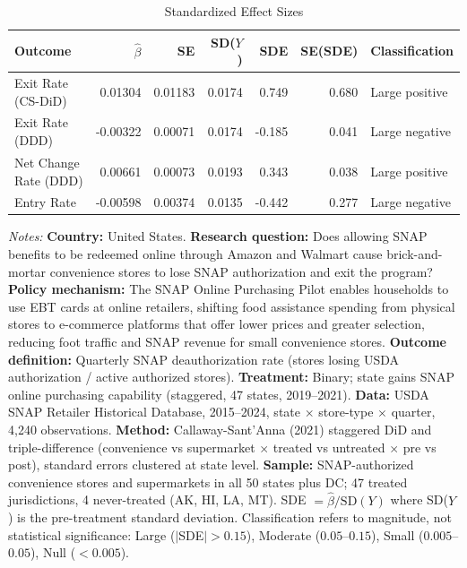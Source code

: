 \begin{table}[t]
\centering
\caption{Standardized Effect Sizes}
\label{tab:sde}
\small
\begin{tabular}{lrrrrrl}
\toprule
Outcome & $\hat{\beta}$ & SE & SD($Y$) & SDE & SE(SDE) & Classification \\
\midrule
Exit Rate (CS-DiD) & 0.01304 & 0.01183 & 0.0174 & 0.749 & 0.680 & Large positive \\
Exit Rate (DDD) & -0.00322 & 0.00071 & 0.0174 & -0.185 & 0.041 & Large negative \\
Net Change Rate (DDD) & 0.00661 & 0.00073 & 0.0193 & 0.343 & 0.038 & Large positive \\
Entry Rate & -0.00598 & 0.00374 & 0.0135 & -0.442 & 0.277 & Large negative \\
\bottomrule
\end{tabular}
\begin{tablenotes}
\item \textit{Notes:} \textbf{Country:} United States. \textbf{Research question:} Does allowing SNAP benefits to be redeemed online through Amazon and Walmart cause brick-and-mortar convenience stores to lose SNAP authorization and exit the program? \textbf{Policy mechanism:} The SNAP Online Purchasing Pilot enables households to use EBT cards at online retailers, shifting food assistance spending from physical stores to e-commerce platforms that offer lower prices and greater selection, reducing foot traffic and SNAP revenue for small convenience stores. \textbf{Outcome definition:} Quarterly SNAP deauthorization rate (stores losing USDA authorization / active authorized stores). \textbf{Treatment:} Binary; state gains SNAP online purchasing capability (staggered, 47 states, 2019--2021). \textbf{Data:} USDA SNAP Retailer Historical Database, 2015--2024, state $\times$ store-type $\times$ quarter, 4,240 observations. \textbf{Method:} Callaway-Sant'Anna (2021) staggered DiD and triple-difference (convenience vs supermarket $\times$ treated vs untreated $\times$ pre vs post), standard errors clustered at state level. \textbf{Sample:} SNAP-authorized convenience stores and supermarkets in all 50 states plus DC; 47 treated jurisdictions, 4 never-treated (AK, HI, LA, MT). SDE $= \hat{\beta} / \text{SD}(Y)$ where SD($Y$) is the pre-treatment standard deviation. Classification refers to magnitude, not statistical significance: Large ($|$SDE$| > 0.15$), Moderate ($0.05$--$0.15$), Small ($0.005$--$0.05$), Null ($< 0.005$).
\end{tablenotes}
\end{table}

